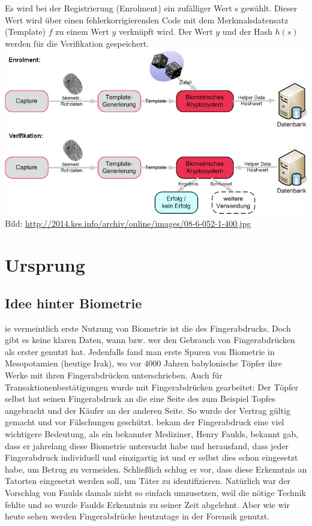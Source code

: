 \documentclass[12pt,a4paper]{article}
\begin{document}
Es wird bei der Registrierung (Enrolment) ein zufälliger Wert s gewählt. Dieser Wert wird über einen fehlerkorrigierenden Code mit dem Merkmalsdatensatz (Template) $f$ zu einem Wert $y$ verknüpft wird. Der Wert $y$ und der Hash $h(s)$ werden für die Verifikation gespeichert.
\cite{repetico}
\newline \newline
\includegraphics[scale=0.6]{08-6-052-1.jpg}
\newline
Bild: \url{http://2014.kes.info/archiv/online/images/08-6-052-1-400.jpg}

\section{Ursprung}
\subsection{Idee hinter Biometrie}
ie vermeintlich erste Nutzung von Biometrie ist die des Fingerabdrucks. Doch gibt es keine klaren Daten, wann bzw. wer den Gebrauch von Fingerabdrücken als erster genutzt hat. Jedenfalls fand man erste Spuren von Biometrie in Mesopotamien (heutige Irak), wo vor 4000 Jahren babylonische Töpfer ihre Werke mit ihren Fingerabdrücken unterschrieben. Auch für Transaktionenbestätigungen wurde mit Fingerabdrücken gearbeitet: Der Töpfer selbst hat seinen Fingerabdruck an die eine Seite des zum Beispiel Topfes angebracht und der Käufer an der anderen Seite. So wurde der Vertrag gültig gemacht und vor Fälschungen geschützt.  bekam der Fingerabdruck eine viel wichtigere Bedeutung, als ein bekannter Mediziner, Henry Faulds, bekannt gab, dass er jahrelang diese Biometrie untersucht habe und herausfand, dass jeder Fingerabdruck individuell und einzigartig ist und er selbst dies schon eingesetzt habe, um Betrug zu vermeiden. Schließlich schlug er vor, dass diese Erkenntnis an Tatorten eingesetzt werden soll, um Täter zu identifizieren. Natürlich war der Vorschlag von Faulds damals nicht so einfach umzusetzen, weil die nötige Technik fehlte und so wurde Faulds Erkenntnis zu seiner Zeit abgelehnt. Aber wie wir heute sehen werden Fingerabdrücke heutzutage in der Forensik genutzt.
\cite{online_signatures}
\end{document}

